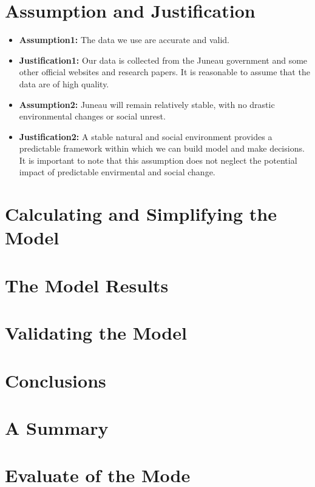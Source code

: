 \documentclass{mcmthesis}
\begin{document}
\section{Assumption and Justification}
\begin{itemize}
  \item \textbf{Assumption1:} The data we use are accurate and valid. 
  \item \textbf{Justification1:} Our data is collected from the Juneau government and some other official websites and research papers. 
  It is reasonable to assume that the data are of high quality.

  \item \textbf{Assumption2:} Juneau will remain relatively stable, with no drastic environmental changes or social unrest.
  \item \textbf{Justification2:} A stable natural and social environment provides a predictable framework within which we can build model and make decisions. 
  It is important to note that this assumption does not neglect the potential impact of predictable envirmental and social change.
\end{itemize}

\section{Calculating and Simplifying the Model  }

\section{The Model Results}

\section{Validating the Model}

\section{Conclusions}

\section{A Summary}

\section{Evaluate of the Mode}
\end{document}
